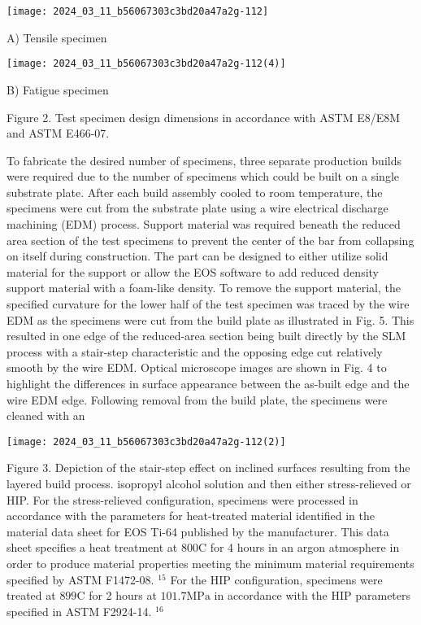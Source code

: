 \documentclass[10pt]{article}
\begin{document}
\begin{center}
\texttt{[image: 2024\_03\_11\_b56067303c3bd20a47a2g-112]}
\end{center}

A) Tensile specimen

\begin{center}
\texttt{[image: 2024\_03\_11\_b56067303c3bd20a47a2g-112(4)]}
\end{center}

B) Fatigue specimen

Figure 2. Test specimen design dimensions in accordance with ASTM E8/E8M and ASTM E466-07.

To fabricate the desired number of specimens, three separate production builds were required due to the number of specimens which could be built on a single substrate plate. After each build assembly cooled to room temperature, the specimens were cut from the substrate plate using a wire electrical discharge machining (EDM) process. Support material was required beneath the reduced area section of the test specimens to prevent the center of the bar from collapsing on itself during construction. The part can be designed to either utilize solid material for the support or allow the EOS software to add reduced density support material with a foam-like density. To remove the support material, the specified curvature for the lower half of the test specimen was traced by the wire EDM as the specimens were cut from the build plate as illustrated in Fig. 5. This resulted in one edge of the reduced-area section being built directly by the SLM process with a stair-step characteristic and the opposing edge cut relatively smooth by the wire EDM. Optical microscope images are shown in Fig. 4 to highlight the differences in surface appearance between the as-built edge and the wire EDM edge. Following removal from the build plate, the specimens were cleaned with an

\begin{center}
\texttt{[image: 2024\_03\_11\_b56067303c3bd20a47a2g-112(2)]}
\end{center}

Figure 3. Depiction of the stair-step effect on inclined surfaces resulting from the layered build process. isopropyl alcohol solution and then either stress-relieved or HIP. For the stress-relieved configuration, specimens were processed in accordance with the parameters for heat-treated material identified in the material data sheet for EOS Ti-64 published by the manufacturer. This data sheet specifies a heat treatment at $800 \mathrm{C}$ for 4 hours in an argon atmosphere in order to produce material properties meeting the minimum material requirements specified by ASTM F1472-08. ${ }^{15}$ For the HIP configuration, specimens were treated at $899 \mathrm{C}$ for 2 hours at $101.7 \mathrm{MPa}$ in accordance with the HIP parameters specified in ASTM F2924-14. ${ }^{16}$
\end{document}
